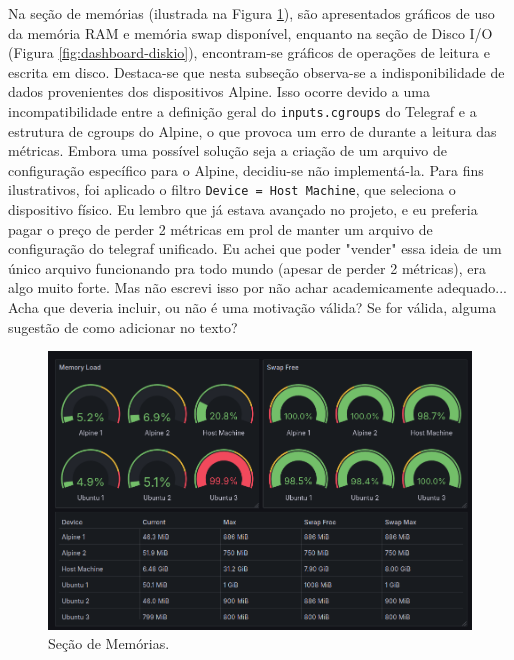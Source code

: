 Na seção de memórias (ilustrada na Figura \ref{fig:dashboard-memory}), são apresentados gráficos de uso da memória RAM e memória swap disponível, enquanto na seção de Disco I/O (Figura \ref{fig:dashboard-diskio}), encontram-se gráficos de operações de leitura e escrita em disco. Destaca-se que nesta subseção observa-se a indisponibilidade de dados provenientes dos dispositivos Alpine. Isso ocorre devido a uma incompatibilidade entre a definição geral do \verb|inputs.cgroups| do Telegraf e a estrutura de cgroups do Alpine, o que provoca um erro de  durante a leitura das métricas.{\color{red} Embora uma possível solução seja a criação de um arquivo de configuração específico para o Alpine, decidiu-se não implementá-la. Para fins ilustrativos, foi aplicado o filtro \verb|Device = Host Machine|, que seleciona o dispositivo físico.
} {\color{blue}Eu lembro que já estava avançado no projeto, e eu preferia pagar o preço de perder 2 métricas em prol de manter um arquivo de configuração do telegraf unificado. Eu achei que poder "vender" essa ideia de um único arquivo funcionando pra todo mundo (apesar de perder 2 métricas), era algo muito forte. Mas não escrevi isso por não achar academicamente adequado... Acha que deveria incluir, ou não é uma motivação válida? Se for válida, alguma sugestão de como adicionar no texto?}
\begin{figure}[H]
\centering
\setlength{\abovecaptionskip}{-20pt}
\includegraphics[width=\textwidth]{Imagens/chap04/dashboard/memory.png}
\caption{Seção de Memórias.}
\label{fig:dashboard-memory}
\end{figure}

\vspace{1cm}

